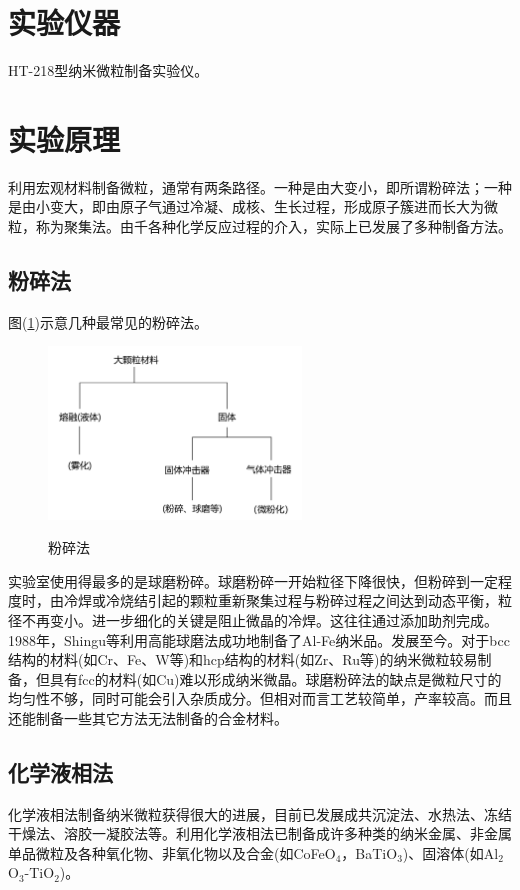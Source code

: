 \documentclass[a4paper]{article}
\begin{document}
\section{实验仪器}
HT-218型纳米微粒制备实验仪。

\section{实验原理}
利用宏观材料制备微粒，通常有两条路径。一种是由大变小，即所谓粉碎法；一种是由小变大，即由原子气通过冷凝、成核、生长过程，形成原子簇进而长大为微粒，称为聚集法。由千各种化学反应过程的介入，实际上已发展了多种制备方法。
\subsection{粉碎法}
图(\ref{fig3})示意几种最常见的粉碎法。
\begin{figure}[!h]
\centering
\includegraphics[width=0.6\textwidth]{fig/fig3.pdf}\\
\caption{粉碎法}\label{fig3}
\end{figure}

实验室使用得最多的是球磨粉碎。球磨粉碎一开始粒径下降很快，但粉碎到一定程度时，由冷焊或冷烧结引起的颗粒重新聚集过程与粉碎过程之间达到动态平衡，粒径不再变小。进一步细化的关键是阻止微晶的冷焊。这往往通过添加助剂完成。1988年，Shingu等利用高能球磨法成功地制备了Al-Fe纳米品。发展至今。对于bcc结构的材料(如Cr、Fe、W等)和hcp结构的材料(如Zr、Ru等)的纳米微粒较易制备，但具有fcc的材料(如Cu)难以形成纳米微晶。球磨粉碎法的缺点是微粒尺寸的均匀性不够，同时可能会引入杂质成分。但相对而言工艺较简单，产率较高。而且还能制备一些其它方法无法制备的合金材料。
\subsection{化学液相法}
化学液相法制备纳米微粒获得很大的进展，目前已发展成共沉淀法、水热法、冻结干燥法、溶胶一凝胶法等。利用化学液相法已制备成许多种类的纳米金属、非金属单品微粒及各种氧化物、非氧化物以及合金(如CoFeO$_4$，BaTiO$_3$)、固溶体(如Al$_2$O$_3$-TiO$_2$)。
\end{document}
